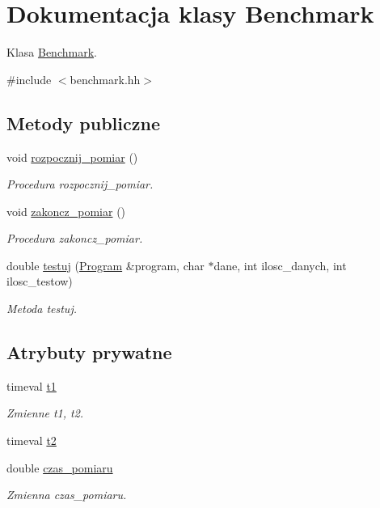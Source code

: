 \hypertarget{class_benchmark}{\section{Dokumentacja klasy Benchmark}
\label{class_benchmark}
}


Klasa \hyperlink{class_benchmark}{Benchmark}.  




{\ttfamily \#include $<$benchmark.\-hh$>$}

\subsection*{Metody publiczne}
\begin{DoxyCompactItemize}
\item 
void \hyperlink{class_benchmark_a684ddcbdd22608838da1ad23f1fcc2ce}{rozpocznij\-\_\-pomiar} ()
\begin{DoxyCompactList}\small\item\em Procedura rozpocznij\-\_\-pomiar. \end{DoxyCompactList}\item 
void \hyperlink{class_benchmark_a3f4b4595a3d1145d238f5b3c8486d875}{zakoncz\-\_\-pomiar} ()
\begin{DoxyCompactList}\small\item\em Procedura zakoncz\-\_\-pomiar. \end{DoxyCompactList}\item 
double \hyperlink{class_benchmark_ad2f9d4a8ee5a33de5261c2b2eff3d87a}{testuj} (\hyperlink{class_program}{Program} \&program, char $\ast$dane, int ilosc\-\_\-danych, int ilosc\-\_\-testow)
\begin{DoxyCompactList}\small\item\em Metoda testuj. \end{DoxyCompactList}\end{DoxyCompactItemize}
\subsection*{Atrybuty prywatne}
\begin{DoxyCompactItemize}
\item 
timeval \hyperlink{class_benchmark_ab951e55dc4470926e0eb0761804f13bc}{t1}
\begin{DoxyCompactList}\small\item\em Zmienne t1, t2. \end{DoxyCompactList}\item 
timeval \hyperlink{class_benchmark_a2b145dd2458fea33d6df41f310058bec}{t2}
\item 
double \hyperlink{class_benchmark_ab72b3cbe324970fd8c738f03718d52fc}{czas\-\_\-pomiaru}
\begin{DoxyCompactList}\small\item\em Zmienna czas\-\_\-pomiaru. \end{DoxyCompactList}\end{DoxyCompactItemize}


